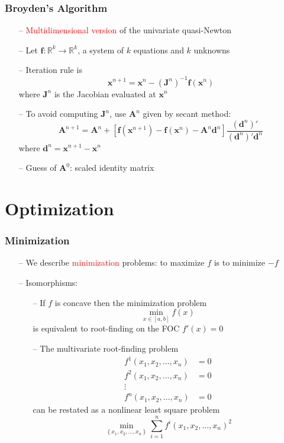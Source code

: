 \documentclass[aspectratio=169, 11pt]{beamer}
\begin{document}
\begin{frame}
\frametitle{Broyden's Algorithm}
  \begin{itemize}
    \item[--] \textcolor{red}{Multidimensional version} of the univariate quasi-Newton
    \bigskip
    \item[--] Let $\mathbf{f}:\mathbb{R}^{k}\to\mathbb{R}^{k}$, a system of $k$ equations and $k$ unknowns
    \bigskip
    \item[--] Iteration rule is
    \[
      \mathbf{x}^{n+1}=\mathbf{x}^{n}-\left(\mathbf{J}^{n}\right)^{-1}\mathbf{f}\left(\mathbf{x}^{n}\right)
    \]
    where $\mathbf{J}^{n}$ is the Jacobian evaluated at $\mathbf{x}^{n}$
    \bigskip
    \item[--] To avoid computing $\mathbf{J}^{n}$, use $\mathbf{A}^{n}$ given by secant method:
    \[
      \mathbf{A}^{n+1}=\mathbf{A}^{n}+\left[\mathbf{f}\left(\mathbf{x}^{n+1}\right)-\mathbf{f}\left(\mathbf{x}^{n}\right)-\mathbf{A}^{n}\mathbf{d}^{n}\right]\frac{\left(\mathbf{d}^{n}\right)'}{\left(\mathbf{d}^{n}\right)'\mathbf{d}^{n}}
    \]
    where $\mathbf{d}^{n}=\mathbf{x}^{n+1}-\mathbf{x}^{n}$
    \item[--] Guess of $\mathbf{A}^0$: scaled identity matrix
  \end{itemize}
\end{frame}

\section{Optimization}
\begin{frame}
\frametitle{Minimization}
  \begin{itemize}
    \item[--] We describe \textcolor{red}{minimization} problems: to maximize $f$ is to minimize $-f$
    \item[--] Isomorphisms:
    \begin{itemize}
      \item[--] If $f$ is concave then the minimization problem
      \[
        \min_{x\in\left[a,b\right]}f\left(x\right)
      \]
      is equivalent to root-finding on the FOC $f'\left(x\right)=0$
      \medskip
      \item[--] The multivariate root-finding problem
      \begin{align*}
        f^{1}\left(x_{1},x_{2},\ldots,x_{n}\right) & =0\\
        f^{2}\left(x_{1},x_{2},\ldots,x_{n}\right) & =0\\
        \vdots\\
        f^{n}\left(x_{1},x_{2},\ldots,x_{n}\right) & =0
      \end{align*}
      can be restated as a nonlinear least square problem
      \[
        \min_{\left\{ x_{1},x_{2},\ldots,x_{n}\right\} }\sum_{i=1}^{n}f^{i}\left(x_{1},x_{2},\ldots,x_{n}\right)^{2}
      \]
    \end{itemize}
  \end{itemize}
\end{frame}
\end{document}
